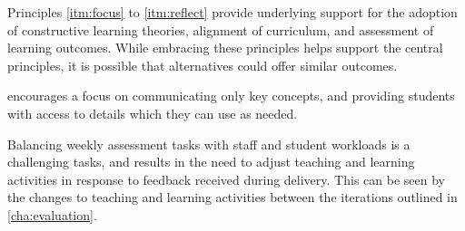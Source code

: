 Principles \ref{itm:focus} to \ref{itm:reflect} provide underlying support for the adoption of constructive learning theories, alignment of curriculum, and assessment of learning outcomes. While embracing these principles helps support the central principles, it is possible that alternatives could offer similar outcomes.


 encourages a focus on communicating only key concepts, and providing students with access to details which they can use as needed. 










Balancing weekly assessment tasks with staff and student workloads is a challenging tasks, and results in the need to adjust teaching and learning activities in response to feedback received during delivery. This can be seen by the changes to teaching and learning activities between the iterations outlined in \cref{cha:evaluation}.  


